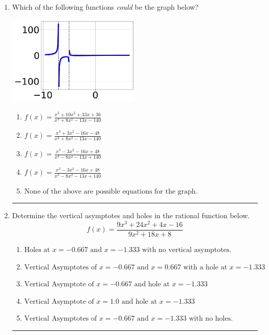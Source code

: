 \documentclass[14pt]{extbook}
\newcommand{\litem}[1]{\item#1\hspace*{-1cm}\rule{\textwidth}{0.4pt}}
\begin{document}
\begin{enumerate}
{\begin{enumerate}[label=\Alph*.]
\end{enumerate} }
\litem{
Which of the following functions \textit{could} be the graph below?
\begin{center}
    \includegraphics[width=0.5\textwidth]{../Figures/identifyGraphOfRationalFunctionB.png}
\end{center}
\begin{enumerate}[label=\Alph*.]
\item \( f(x)=\frac{x^{3} +10 x^{2} +33 x + 36}{x^{3} +8 x^{2} -13 x -140} \)
\item \( f(x)=\frac{x^{3} +3 x^{2} -16 x -48}{x^{3} +8 x^{2} -13 x -140} \)
\item \( f(x)=\frac{x^{3} -3 x^{2} -16 x + 48}{x^{3} -8 x^{2} -13 x + 140} \)
\item \( f(x)=\frac{x^{3} -3 x^{2} -16 x + 48}{x^{3} -8 x^{2} -13 x + 140} \)
\item \( \text{None of the above are possible equations for the graph.} \)

\end{enumerate} }
\litem{
Determine the vertical asymptotes and holes in the rational function below.\[ f(x) = \frac{9x^{3} +24 x^{2} +4 x -16}{9x^{2} +18 x + 8} \]\begin{enumerate}[label=\Alph*.]
\item \( \text{Holes at } x = -0.667 \text{ and } x = -1.333 \text{ with no vertical asymptotes.} \)
\item \( \text{Vertical Asymptotes of } x = -0.667 \text{ and } x = 0.667 \text{ with a hole at } x = -1.333 \)
\item \( \text{Vertical Asymptote of } x = -0.667 \text{ and hole at } x = -1.333 \)
\item \( \text{Vertical Asymptote of } x = 1.0 \text{ and hole at } x = -1.333 \)
\item \( \text{Vertical Asymptotes of } x = -0.667 \text{ and } x = -1.333 \text{ with no holes.} \)


\end{enumerate}}
\end{enumerate}
\end{document}
